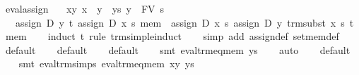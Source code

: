 \begin{isabellebody}
\isanewline
{}\isamarkupfalse%
\ eval{}assign{}{}\isanewline
\ \ \ xy{}\ {}x\ {}\ y{}\ \ ys{}\ {}y\ {}\ FV\ s{}\isanewline
\ \ \ {}assign\ D\ y\ t\ {}assign\ D\ x\ s\ mem{}\ {}\ assign\ D\ x\ s\ {}assign\ D\ y\ {}trm{}subst\ x\ s\ t{}\ mem{}{}\isanewline
%
\isadelimproof
\ \ %
\endisadelimproof
%
\isatagproof
{}\isamarkupfalse%
\ {}induct\ t\ rule{}\ trm{}simple{}induct{}\isanewline
\ \ \isamarkupfalse%
\ {}simp\ add{}\ assign{}def\ set{}mem{}def{}\isanewline
\ \ \isamarkupfalse%
\ default\isanewline
\ \ \isamarkupfalse%
\ default\isanewline
\ \ \isamarkupfalse%
\ default\isanewline
\ \ \isamarkupfalse%
\ {}smt\ eval{}trm{}eq{}mem\ ys{}\isanewline
\ \ \isamarkupfalse%
\ auto\isanewline
\ \ \isamarkupfalse%
\ default\isanewline
\ \ \isamarkupfalse%
\ {}smt\ eval{}trm{}simps{}{}{}\ eval{}trm{}eq{}mem\ xy\ ys{}\isanewline

\end{isabellebody}

